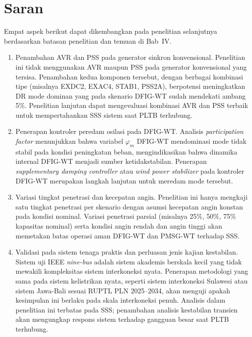\section{Saran}

Empat aspek berikut dapat dikembangkan pada penelitian selanjutnya berdasarkan
batasan penelitian dan temuan di Bab~IV.

\begin{enumerate}

\item Penambahan AVR dan PSS pada generator sinkron konvensional.
Penelitian ini tidak menggunakan AVR maupun PSS pada generator konvensional yang
tersisa. Penambahan kedua komponen tersebut, dengan berbagai kombinasi tipe
(misalnya EXDC2, EXAC4, STAB1, PSS2A), berpotensi meningkatkan DR mode dominan
yang pada skenario DFIG-WT sudah mendekati ambang 5\%. Penelitian lanjutan dapat
mengevaluasi kombinasi AVR dan PSS terbaik untuk mempertahankan SSS sistem saat
PLTB terhubung.

\item Penerapan kontroler peredam osilasi pada DFIG-WT. Analisis
\textit{participation factor} menunjukkan bahwa variabel $\varphi_m$ DFIG-WT
mendominasi mode tidak stabil pada kondisi peningkatan beban, mengindikasikan
bahwa dinamika internal DFIG-WT menjadi sumber ketidakstabilan. Penerapan
\textit{supplementary damping controller} atau \textit{wind power stabilizer}
pada kontroler DFIG-WT merupakan langkah lanjutan untuk meredam mode tersebut.

\item Variasi tingkat penetrasi dan kecepatan angin. Penelitian ini
hanya mengkaji satu tingkat penetrasi per skenario dengan asumsi kecepatan angin
konstan pada kondisi nominal. Variasi penetrasi parsial (misalnya 25\%, 50\%,
75\% kapasitas nominal) serta kondisi angin rendah dan angin tinggi akan memetakan
batas operasi aman DFIG-WT dan PMSG-WT terhadap SSS.

\item Validasi pada sistem tenaga praktis dan perluasan jenis kajian
kestabilan. Sistem uji IEEE \textit{nine-bus} adalah sistem akademis berskala
kecil yang tidak mewakili kompleksitas sistem interkoneksi nyata. Penerapan
metodologi yang sama pada sistem kelistrikan nyata, seperti sistem interkoneksi
Sulawesi atau sistem Jawa-Bali sesuai RUPTL PLN 2025--2034, akan menguji apakah
kesimpulan ini berlaku pada skala interkoneksi penuh. Analisis dalam penelitian
ini terbatas pada SSS; penambahan analisis kestabilan transien akan mengungkap
respons sistem terhadap gangguan besar saat PLTB terhubung.

\end{enumerate}


